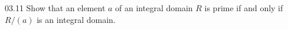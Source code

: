\documentclass[11pt]{article}
\begin{document}
\begin{problem}{03.11}
  Show that an element $a$ of an integral domain $R$ is prime if and only if
  $R/(a)$ is an integral domain.
\end{problem}
\end{document}
